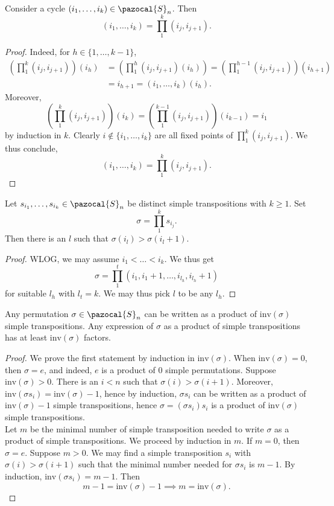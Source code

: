 \begin{lemma}
    Consider a cycle $(i_1,\dots,i_k)\in \pazocal{S}_n$. Then 
    $$
        (i_1,\dots,i_k) = \prod_1^k (i_j,i_{j+1}). 
    $$
\end{lemma}
\begin{proof}
    Indeed, for $h\in \{1,\dots,k-1\}$,
    \begin{align*}
        \left(\prod_1^k (i_j,i_{j+1})\right)(i_h) &= \left(\prod_1^h (i_j,i_{j+1})(i_h)\right)= \left(\prod_1^{h-1} (i_j,i_{j+1})\right)( i_{h+1})\\
        &=i_{h+1} = (i_1,\dots,i_k)(i_h).
    \end{align*}
    Moreover, 
    $$
        \left(\prod_1^k (i_j,i_{j+1})\right)(i_k) = \left(\prod_1^{k-1} (i_j,i_{j+1})\right)(i_{k-1}) = i_1
    $$
    by induction in $k$.
    Clearly $i\notin\{i_1,\dots,i_k\}$ are all fixed points of $\prod_1^k (i_j,i_{j+1})$. We thus conclude,
    $$
        (i_1,\dots,i_k) = \prod_1^k (i_j,i_{j+1}).
    $$
\end{proof}
\begin{lemma}
    Let $s_{i_1},\dots,s_{i_{k}}\in \pazocal{S}_n$ be distinct simple transpositions with $k\geq 1$. Set
    $$
        \sigma = \prod_1^k s_{i_j}.
    $$
    Then there is an $l$ such that $\sigma(i_l)>\sigma(i_l+1)$.
\end{lemma}
\begin{proof}
    WLOG, we may assume $i_1<\dots <i_k$. We thus get
    $$
        \sigma = \prod_1^t (i_1,i_1+1,\dots,i_{l_h},i_{l_h}+1)
    $$
    for suitable $l_h$ with $l_t = k$. We may thus pick $l$ to be any $l_h$. 
\end{proof}
\begin{lemma}
    Any permutation $\sigma\in \pazocal{S}_n$ can be written as a product of $\mathrm{inv}(\sigma)$ simple transpositions. Any expression of $\sigma$ as a product of simple transpositions has at least $\mathrm{inv}(\sigma)$ factors. 
\end{lemma}
\begin{proof}
    We prove the first statement by induction in $\mathrm{inv}(\sigma)$. When $\mathrm{inv}(\sigma)=0$, then $\sigma=e$, and indeed, $e$ is a product of $0$ simple permutations. Suppose $\mathrm{inv}(\sigma)>0$. There is an $i<n$ such that $\sigma(i)>\sigma(i+1)$. Moreover, $\mathrm{inv}(\sigma s_i)= \mathrm{inv}(\sigma)-1$, hence by induction, $\sigma s_i$ can be written as a product of $\mathrm{inv}(\sigma)-1$ simple transpositions, hence $\sigma = (\sigma s_i)s_i$ is a product of $\mathrm{inv}(\sigma)$ simple transpositions.\\
    Let $m$ be the minimal number of simple transposition needed to write $\sigma$ as a product of simple transpositions. We proceed by induction in $m$. If $m=0$, then $\sigma = e$. Suppose $m>0$. We may find a simple transposition $s_i$ with $\sigma(i) >\sigma(i+1)$ such that the minimal number needed for $\sigma s_i$ is $m-1$. By induction, $\mathrm{inv}(\sigma s_i) = m-1$. Then 
    $$
        m-1 = \mathrm{inv}(\sigma)-1 \implies m = \mathrm{inv}(\sigma).
    $$
\end{proof}
